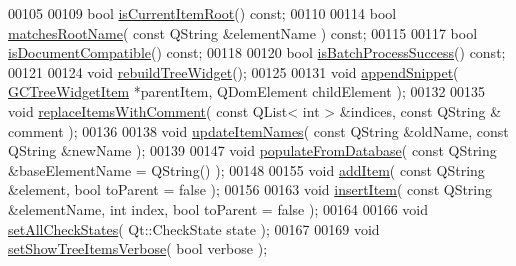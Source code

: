 \begin{DoxyCode}
00105 
00109   \textcolor{keywordtype}{bool} \hyperlink{class_g_c_dom_tree_widget_a928f82ae2f670600f10cbde52e9188fc}{isCurrentItemRoot}() \textcolor{keyword}{const};
00110 
00114   \textcolor{keywordtype}{bool} \hyperlink{class_g_c_dom_tree_widget_a7bcb145540df569caeca3119cfebc23c}{matchesRootName}( \textcolor{keyword}{const} QString &elementName ) \textcolor{keyword}{const};
00115 
00117   \textcolor{keywordtype}{bool} \hyperlink{class_g_c_dom_tree_widget_a123f18a1174ae99e567f6a2335ce1824}{isDocumentCompatible}() \textcolor{keyword}{const};
00118 
00120   \textcolor{keywordtype}{bool} \hyperlink{class_g_c_dom_tree_widget_ac8a71d6111a3615a5a7eecea457a3a34}{isBatchProcessSuccess}() \textcolor{keyword}{const};
00121 
00124   \textcolor{keywordtype}{void} \hyperlink{class_g_c_dom_tree_widget_a0ac81800aa6d507dd17cbffa6814a632}{rebuildTreeWidget}();
00125 
00131   \textcolor{keywordtype}{void} \hyperlink{class_g_c_dom_tree_widget_afdf29124d6e6cc6061f5e9978c6a7f81}{appendSnippet}( \hyperlink{class_g_c_tree_widget_item}{GCTreeWidgetItem} *parentItem, QDomElement childElement );
00132 
00135   \textcolor{keywordtype}{void} \hyperlink{class_g_c_dom_tree_widget_a0badfb9fc7250c5186fb9575019c335f}{replaceItemsWithComment}( \textcolor{keyword}{const} QList< int > &indices, \textcolor{keyword}{const} QString &
      comment );
00136 
00138   \textcolor{keywordtype}{void} \hyperlink{class_g_c_dom_tree_widget_a1ec3ed3851e25adf1fac93fb42a4a8a7}{updateItemNames}( \textcolor{keyword}{const} QString &oldName, \textcolor{keyword}{const} QString &newName );
00139 
00147   \textcolor{keywordtype}{void} \hyperlink{class_g_c_dom_tree_widget_a06ee56d0aa9348302dbb8d3f4e5bab44}{populateFromDatabase}( \textcolor{keyword}{const} QString &baseElementName = QString() );
00148 
00155   \textcolor{keywordtype}{void} \hyperlink{class_g_c_dom_tree_widget_adbbe1eeb6dc9a2d6c84a7133106a7f77}{addItem}( \textcolor{keyword}{const} QString &element, \textcolor{keywordtype}{bool} toParent = \textcolor{keyword}{false} );
00156 
00163   \textcolor{keywordtype}{void} \hyperlink{class_g_c_dom_tree_widget_a5e4117a9b47ac0bd520d32fc54d5f1ed}{insertItem}( \textcolor{keyword}{const} QString &elementName, \textcolor{keywordtype}{int} index, \textcolor{keywordtype}{bool} toParent = \textcolor{keyword}{false}
       );
00164 
00166   \textcolor{keywordtype}{void} \hyperlink{class_g_c_dom_tree_widget_ae61a0ae85b5d250c49ebc8cfc6c24d09}{setAllCheckStates}( Qt::CheckState state );
00167 
00169   \textcolor{keywordtype}{void} \hyperlink{class_g_c_dom_tree_widget_a821fc62f1e29b67b3f6b00cd50de3bc8}{setShowTreeItemsVerbose}( \textcolor{keywordtype}{bool} verbose );

\end{DoxyCode}
